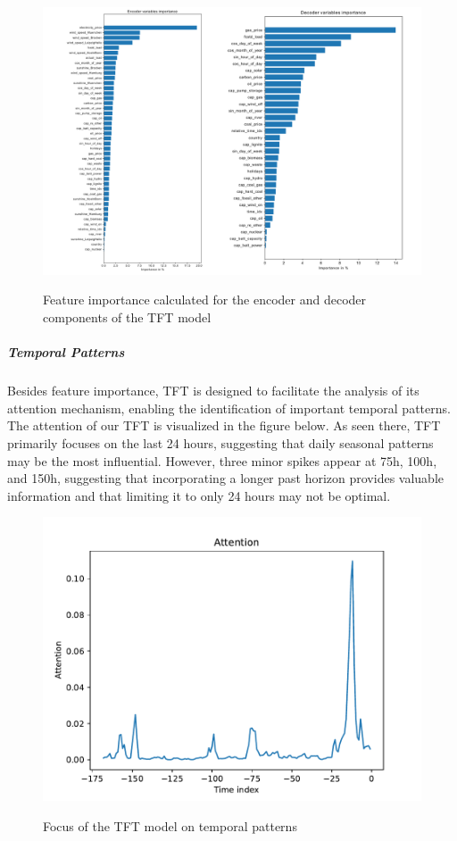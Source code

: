 \documentclass[a4paper]{article}
\begin{document}
    \begin{figure}
\centering
{\includegraphics[keepaspectratio]{src/encoder_decoder_feat_imp.pdf}}
\caption{Feature importance calculated for the encoder and decoder
components of the TFT model}
\end{figure}

    \subparagraph{Temporal Patterns}\label{temporal-patterns}

Besides feature importance, TFT is designed to facilitate the analysis
of its attention mechanism, enabling the identification of important
temporal patterns. The attention of our TFT is visualized in the figure
below. As seen there, TFT primarily focuses on the last 24 hours,
suggesting that daily seasonal patterns may be the most influential.
However, three minor spikes appear at 75h, 100h, and 150h, suggesting
that incorporating a longer past horizon provides valuable information
and that limiting it to only 24 hours may not be optimal.

    \begin{figure}
\centering
{\includegraphics[keepaspectratio]{"./src/attention.pdf"}}
\caption{Focus of the TFT model on temporal patterns}
\end{figure}
\end{document}
